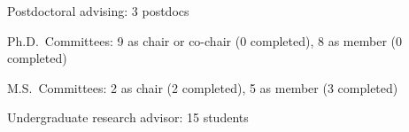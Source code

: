 \begin{veryTightItemize}
    \item Postdoctoral advising: 3 postdocs
    \item Ph.D.\ Committees: 9 as chair or co-chair (0 completed), 8 as member (0 completed)
    \item M.S.\ Committees:  2 as chair (2 completed), 5 as member (3 completed)
    \item Undergraduate research advisor: 15 students
\end{veryTightItemize}
